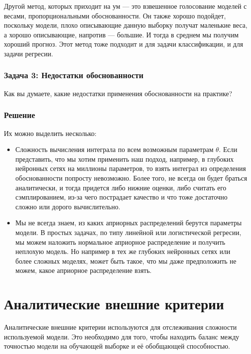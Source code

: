 Другой метод, которых приходит на ум --- это взвешенное голосование моделей с весами, пропорциональными обоснованности. Он также хорошо подойдет, поскольку модели, плохо описывающие данную выборку получат маленькие веса, а хорошо описывающие, напротив --- большие. И тогда в среднем мы получим хороший прогноз. Этот метод тоже подходит и для задачи классификации, и для задачи регресии.

\subsubsection{Задача 3: Недостатки обоснованности}
Как вы думаете, какие недостатки применения обоснованности на практике?
\subsubsection{Решение}

Их можно выделить несколько:
\begin{itemize}
    \item Сложность вычисления интеграла по всем возможным параметрам $\theta$. Если представить, что мы хотим применить наш подход, например, в глубоких нейронных сетях на миллионы параметров, то взять интеграл из определения обоснованности попросту невозможно. Более того, не всегда он будет браться аналитически, и тогда придется либо нижние оценки, либо считать его сэмплированием, из-за чего пострадает качество и что тоже достаточно сложно или дорого вычислительно.
    \item Мы не всегда знаем, из каких априорных распределений берутся параметры модели. В простых задачах, по типу линейной или логистической регресии, мы можем наложить нормальное априорное распределение и получить неплохую модель. Но например в тех же глубоких нейронных сетях или более сложных моделях, может быть такое, что мы даже предположить не можем, какое априорное распределение взять.
\end{itemize}


\section*{Аналитические внешние критерии}

\par Аналитические внешние критерии используются для отслеживания сложности используемой модели. Это необходимо для того, чтобы находить баланс между точностью модели на обучающей выборке и её обобщающей способностью.

